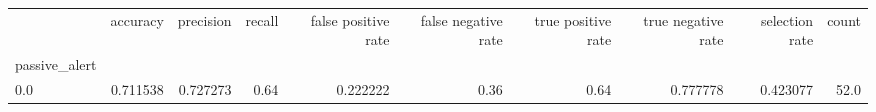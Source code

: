 \begin{tabular}{lrrrrrrrrr}
\toprule
{} &  accuracy &  precision &  recall &  false positive rate &  false negative rate &  true positive rate &  true negative rate &  selection rate &  count \\
passive\_alert &           &            &         &                      &                      &                     &                     &                 &        \\
\midrule
0.0           &  0.711538 &   0.727273 &    0.64 &             0.222222 &                 0.36 &                0.64 &            0.777778 &        0.423077 &   52.0 \\
\bottomrule
\end{tabular}

